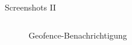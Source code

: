\documentclass{beamer}
\begin{document}
	\begin{frame}{Screenshots II}
		\begin{columns}[onlytextwidth]
			
			\begin{column}{0.5\textwidth}
				\centering
				\begin{figure}
					\caption{Geofence-Benachrichtigung}
				\end{figure}
			\end{column}
			

\end{columns}
\end{frame}
\end{document}
